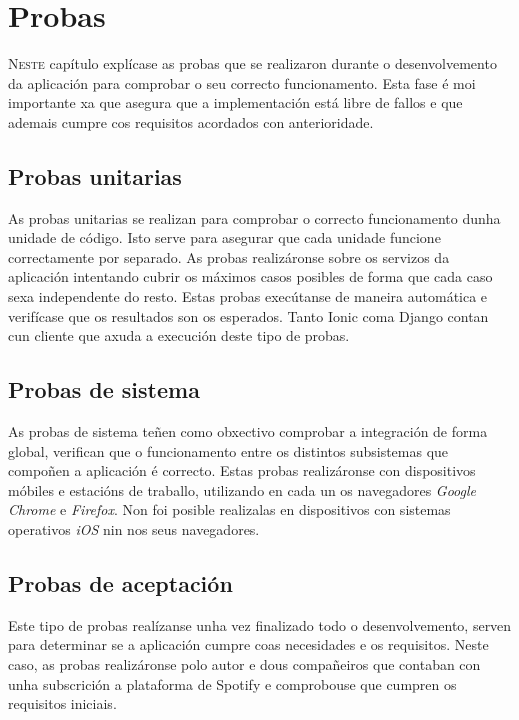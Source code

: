 \chapter{Probas}
\label{chap:probas}

\lettrine{N}{este} capítulo explícase as probas que se realizaron durante o desenvolvemento da aplicación para comprobar o seu correcto funcionamento. Esta fase é moi importante xa que asegura que a implementación está libre de fallos e que ademais cumpre cos requisitos acordados con anterioridade.

\section{Probas unitarias}
As probas unitarias se realizan para comprobar o correcto funcionamento dunha unidade de código. Isto serve para asegurar que cada unidade funcione correctamente por separado. As probas realizáronse sobre os servizos da aplicación intentando cubrir os máximos casos posibles de forma que cada caso sexa independente do resto. Estas probas execútanse de maneira automática e verifícase que os resultados son os esperados. Tanto Ionic coma Django contan cun cliente que axuda a execución deste tipo de probas.

\section{Probas de sistema}
As probas de sistema teñen como obxectivo comprobar a integración de forma global, verifican que o funcionamento entre os distintos subsistemas que compoñen a aplicación é correcto. Estas probas realizáronse con dispositivos móbiles e estacións de traballo, utilizando en cada un os navegadores \textit{Google Chrome} e \textit{Firefox}. Non foi posible realizalas en dispositivos con sistemas operativos \textit{iOS} nin nos seus navegadores.

\section{Probas de aceptación}
Este tipo de probas realízanse unha vez finalizado todo o desenvolvemento, serven para determinar se a aplicación cumpre coas necesidades e os requisitos. Neste caso, as probas realizáronse polo autor e dous compañeiros que contaban con unha subscrición a plataforma de Spotify e comprobouse que cumpren os requisitos iniciais.
